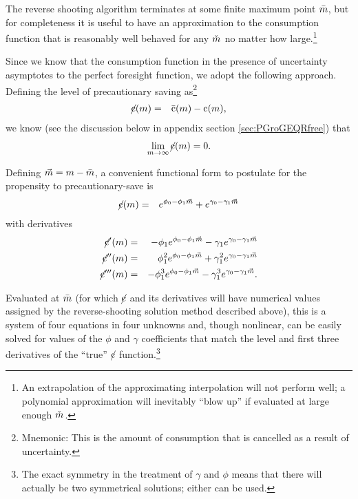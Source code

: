 \message{ !name(TractableBufferStock.tex)}\documentclass{handout}
\begin{document}
The reverse shooting algorithm terminates at some finite maximum point $\bar{m}$, but for completeness 
it is useful to have an approximation to the consumption function that is reasonably well behaved
for any $\mTarg^{\null}$ no matter how large.\footnote{An extrapolation of the approximating interpolation will 
not perform well; a polynomial approximation will inevitably ``blow up'' if evaluated at large enough $\mTarg^{\null}$.}

Since we know that the consumption function in the presence of uncertainty asymptotes to the 
perfect foresight function, we adopt the following approach.  Defining the level of precautionary
saving as\footnote{Mnemonic: This is the amount of consumption that is cancelled as a result of uncertainty.}
\newcommand{\psav}{\cancel{c}}
\newcommand{\psavFunc}{\ensuremath{\cancel{\cFunc}}}
\begin{eqnarray}
  \label{eq:pSavFunc}
  \psavFunc(\mRat) & = & \bar{\cFunc}(\mRat)-\cFunc(\mRat),
\end{eqnarray}
we know (see the discussion below in appendix section \ref{sec:PGroGEQRfree}) that 
\begin{eqnarray}
  \lim_{\mRat \rightarrow \infty} \psavFunc(\mRat) = 0
.
\end{eqnarray}

Defining $\vec{m}=m-\bar{m}$, a convenient functional form to postulate for the
propensity to precautionary-save is
\begin{eqnarray}
  \psavFunc(\mRat) & = & e^{\phi_{0}-\phi_{1} \vec{\mRat}}+e^{\gamma_{0}-\gamma_{1} \vec{\mRat}}
\end{eqnarray}
with derivatives
\begin{eqnarray}
    \psavFunc^{\prime}(\mRat) & = & -\phi_{1} e^{\phi_{0}-\phi_{1} \vec{\mRat}} - \gamma_{1} e^{\gamma_{0}-\gamma_{1} \vec{\mRat}}
\\  \psavFunc^{\prime\prime}(\mRat) & = & \phantom{-}\phi_{1}^{2} e^{\phi_{0}-\phi_{1} \vec{\mRat}} + \gamma_{1}^{2} e^{\gamma_{0}-\gamma_{1} \vec{\mRat}}
\\  \psavFunc^{\prime\prime\prime}(\mRat) & = & -\phi_{1}^{3} e^{\phi_{0}-\phi_{1} \vec{\mRat}} - \gamma_{1}^{3} e^{\gamma_{0}-\gamma_{1} \vec{\mRat}}
.
\end{eqnarray}

Evaluated at $\bar{m}$ (for which $\psavFunc$ and its derivatives will have numerical values
assigned by the reverse-shooting solution method described above), this is a system of four equations in four unknowns and, though nonlinear, can be easily solved for 
values of the $\phi$ and $\gamma$ coefficients that match the level and first three derivatives
of the ``true'' $\psavFunc$ function.\footnote{The exact symmetry in
  the treatment of $\gamma$ and $\phi$ means that there will actually
  be two symmetrical solutions; either can be used.}
\end{document}
